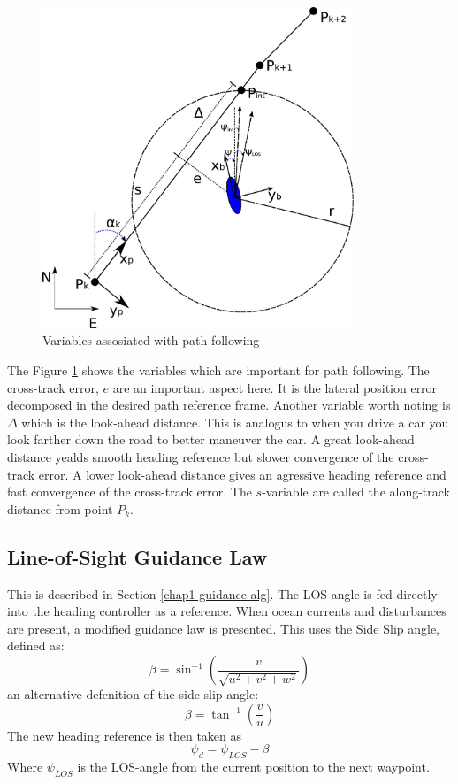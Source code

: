 	\begin{figure}[hbtp]
		\centering
		\includegraphics[width=0.83\textwidth]{pics/waypoint}
		\caption{Variables assosiated with path following}
		\label{fig:ch2-pathfollowing}
	\end{figure}
	The Figure \ref{fig:ch2-pathfollowing} shows the variables which are important for path following. The
	cross-track error, $e$ are an important aspect here. It is the lateral position error decomposed in
	the desired path reference frame. Another variable worth noting is $\Delta$ which is the look-ahead
	distance. This is analogus to when you drive a car you look farther down the road to better maneuver
	the car. A great look-ahead distance yealds smooth heading reference but slower convergence of the
	cross-track error. A lower look-ahead distance gives an agressive heading reference and fast
	convergence of the cross-track error. The $s$-variable are called the along-track distance from point
	$P_k$. 
	
	
	\subsection{Line-of-Sight Guidance Law}
		This is described in Section \ref{chap1-guidance-alg}. The LOS-angle is fed directly into the 
		heading controller as a reference. When ocean currents and disturbances are present, a modified 
		guidance law is presented. This uses the Side Slip angle, defined as:
		\begin{equation}
			\label{eq:ch2-sideslip}
			\beta = \sin^{-1} ( \frac{v}{\sqrt{u^2 + v^2 + w^2}})
		\end{equation}
		an alternative defenition of the side slip angle:
		\begin{equation*}
			\beta = \tan^{-1} (\frac{v}{u})
		\end{equation*}
		The new heading reference is then taken as
		\begin{equation}
			\label{eq:ch2-los-law}
			\psi_d = \psi_{LOS} - \beta
		\end{equation}
		Where $\psi_{LOS}$ is the LOS-angle from the current position to the next waypoint. 

